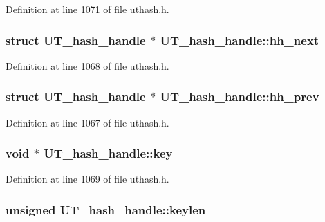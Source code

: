 Definition at line 1071 of file uthash.\-h.

\hypertarget{struct_u_t__hash__handle_a68446f17ac973f8e7e483ec3eca4891c}{
\subsubsection[{hh\-\_\-next}]{\setlength{\rightskip}{0pt plus 5cm}struct {\bf U\-T\-\_\-hash\-\_\-handle} $\ast$ U\-T\-\_\-hash\-\_\-handle\-::hh\-\_\-next}}\label{struct_u_t__hash__handle_a68446f17ac973f8e7e483ec3eca4891c}


Definition at line 1068 of file uthash.\-h.

\hypertarget{struct_u_t__hash__handle_a7426418517c3a1e93fe477e643f60e70}{
\subsubsection[{hh\-\_\-prev}]{\setlength{\rightskip}{0pt plus 5cm}struct {\bf U\-T\-\_\-hash\-\_\-handle} $\ast$ U\-T\-\_\-hash\-\_\-handle\-::hh\-\_\-prev}}\label{struct_u_t__hash__handle_a7426418517c3a1e93fe477e643f60e70}


Definition at line 1067 of file uthash.\-h.

\hypertarget{struct_u_t__hash__handle_a426a06699977756c3b26667ede8f7a2a}{
\subsubsection[{key}]{\setlength{\rightskip}{0pt plus 5cm}void $\ast$ U\-T\-\_\-hash\-\_\-handle\-::key}}\label{struct_u_t__hash__handle_a426a06699977756c3b26667ede8f7a2a}


Definition at line 1069 of file uthash.\-h.

\hypertarget{struct_u_t__hash__handle_af2abdc405972a6bbdee2ade2c0f346c4}{
\subsubsection[{keylen}]{\setlength{\rightskip}{0pt plus 5cm}unsigned U\-T\-\_\-hash\-\_\-handle\-::keylen}}\label{struct_u_t__hash__handle_af2abdc405972a6bbdee2ade2c0f346c4}



